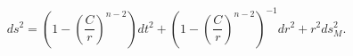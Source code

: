 \begin{equation}
ds^{2}=\left(1-\left(\frac{C}{r}\right)^{n-2}\right)
dt^{2}+\left(1-\left(\frac{C}{r}\right)^{n-2}\right)^{-1}dr^{2}+r^{2}ds_{M}^{2} \label{schd1}.
\end{equation}

